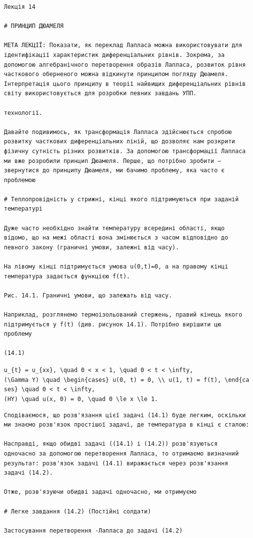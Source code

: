 \documentclass[
  ukrainian,
]{article}
\begin{document}
\begin{verbatim}
Лекція 14

# ПРИНЦИП ДЮАМЕЛЯ

МЕТА ЛЕКЦІЇ: Показати, як переклад Лапласа можна використовувати для ідентифікації характеристик диференціальних рівнів. Зокрема, за допомогою алгебранічного перетворення образів Лапласа, розвиток рівня часткового оберненого можна відкинути принципом погляду Дюамеля. Інтерпретація цього принципу в теорії найвищих диференціальних рівнів світу використовується для розробки певних завдань УПП.

технології.

Давайте подивимось, як трансформація Лапласа здійснюється спробою розвитку часткових диференціальних ліній, що дозволяє нам розкрити фізичну сутність різних розвитків. За допомогою трансформації Лапласа ми вже розробили принцип Дюамеля. Перше, що потрібно зробити — звернутися до принципу Дюамеля, ми бачимо проблему, яка часто є проблемою

# Теплопровідність у стрижні, кінці якого підтримуються при заданій температурі

Дуже часто необхідно знайти температуру всередині області, якщо відомо, що на межі області вона змінюється з часом відповідно до певного закону (граничні умови, залежні від часу).

На лівому кінці підтримується умова u(0,t)=0, а на правому кінці температура задається функцією f(t).

Рис. 14.1. Граничні умови, що залежать від часу.

Наприклад, розглянемо термоізольований стержень, правий кінець якого підтримується у f(t) (див. рисунок 14.1). Потрібно вирішити цю проблему

(14.1)
\end{verbatim}

\texttt{u\_\{t\}\ =\ u\_\{xx\},\ \textbackslash{}quad\ 0\ \textless{}\ x\ \textless{}\ 1,\ \textbackslash{}quad\ 0\ \textless{}\ t\ \textless{}\ \textbackslash{}infty,}
\texttt{(\textbackslash{}Gamma\ Y)\ \textbackslash{}quad\ \textbackslash{}begin\{cases\}\ u(0,\ t)\ =\ 0,\ \textbackslash{}\textbackslash{}\ u(1,\ t)\ =\ f(t),\ \textbackslash{}end\{cases\}\ \textbackslash{}quad\ 0\ \textless{}\ t\ \textless{}\ \textbackslash{}infty,}
\texttt{(HY)\ \textbackslash{}quad\ u(x,\ 0)\ =\ 0,\ \textbackslash{}quad\ 0\ \textbackslash{}le\ x\ \textbackslash{}le\ 1.}

\begin{verbatim}
Сподіваємося, що розв'язання цієї задачі (14.1) буде легким, оскільки ми знаємо розв'язок простішої задачі, де температура в кінці є сталою:

Насправді, якщо обидві задачі ((14.1) і (14.2)) розв'язуються одночасно за допомогою перетворення Лапласа, то отримаємо визначний результат: розв'язок задачі (14.1) виражається через розв'язання задачі (14.2).

Отже, розв'язуючи обидві задачі одночасно, ми отримуємо

# Легке завдання (14.2) (Постійні солдати)

Застосування перетворення -Лапласа до задачі (14.2)
\end{verbatim}
\end{document}
